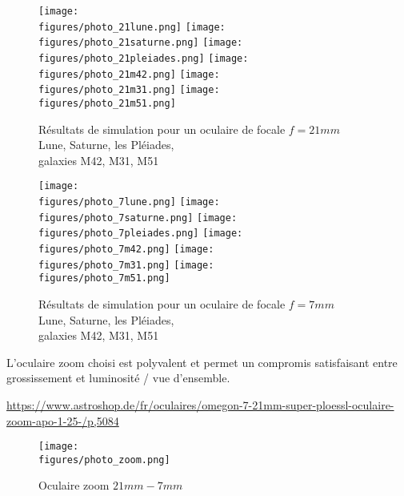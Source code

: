 \begin{figure}[H]
    \centering
    \texttt{[image: \\figures/photo\_21lune.png]}
    \texttt{[image: \\figures/photo\_21saturne.png]}
    \texttt{[image: \\figures/photo\_21pleiades.png]}
    \texttt{[image: \\figures/photo\_21m42.png]}
    \texttt{[image: \\figures/photo\_21m31.png]}
    \texttt{[image: \\figures/photo\_21m51.png]}
    \decoRule
    \caption[
	Résultats de simulation pour un oculaire de focale $f=21mm$\\Lune, Saturne, les Pléiades,\\galaxies M42, M31, M51]{
	Résultats de simulation pour un oculaire de focale $f=21mm$\\Lune, Saturne, les Pléiades,\\galaxies M42, M31, M51}
    \label{fig:	Résultats de simulation pour un oculaire de focale $f=21mm$ Lune, Saturne, les Pléiades, galaxies M42, M31, M51}
    \end{figure}

\begin{figure}[H]
    \centering
    \texttt{[image: \\figures/photo\_7lune.png]}
    \texttt{[image: \\figures/photo\_7saturne.png]}
    \texttt{[image: \\figures/photo\_7pleiades.png]}
    \texttt{[image: \\figures/photo\_7m42.png]}
    \texttt{[image: \\figures/photo\_7m31.png]}
    \texttt{[image: \\figures/photo\_7m51.png]}
    \decoRule
    \caption[
	Résultats de simulation pour un oculaire de focale $f=7mm$\\Lune, Saturne, les Pléiades,\\galaxies M42, M31, M51]{
	Résultats de simulation pour un oculaire de focale $f=7mm$\\Lune, Saturne, les Pléiades,\\galaxies M42, M31, M51}
    \label{fig:	Résultats de simulation pour un oculaire de focale $f=7mm$ Lune, Saturne, les Pléiades, galaxies M42, M31, M51}
    \end{figure}

\vspace{1cm}


L'oculaire zoom choisi est polyvalent et permet un compromis satisfaisant entre grossissement et luminosité / vue d'ensemble.

\url{https://www.astroshop.de/fr/oculaires/omegon-7-21mm-super-ploessl-oculaire-zoom-apo-1-25-/p,5084}

\begin{figure}[H]
    \centering
    \texttt{[image: \\figures/photo\_zoom.png]}
    \decoRule
    \caption[
    Oculaire zoom $21mm-7mm$]{
    Oculaire zoom $21mm-7mm$}
    \label{fig:Oculaire zoom $21mm-7mm$}
    \end{figure}
